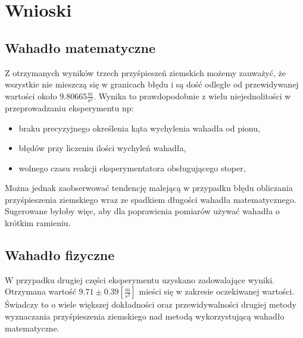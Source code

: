 \documentclass[11pt]{article}
\begin{document}
    \section{Wnioski}
    \subsection*{Wahadło matematyczne}
    Z otrzymanych wyników trzech przyśpieszeń ziemskich możemy zauważyć, że wszystkie nie mieszczą
    się w granicach błędu i są dość odległe od przewidywanej wartości około $9.80665\frac{m}{s^2}$.
    Wynika to prawdopodobnie z wielu niejednolitości w przeprowadzaniu eksperymentu np:
    \begin{itemize}
        \item braku precyzyjnego określenia kąta wychylenia wahadła od pionu,
        \item błędów przy liczeniu ilości wychyleń wahadła,
        \item wolnego czasu reakcji eksperymentatora obsługującego stoper,
    \end{itemize}
    Można jednak zaobserwować tendencję malejącą w przypadku błędu obliczania przyśpieszenia ziemskiego wraz ze spadkiem długości wahadła matematycznego.
    Sugerowane byłoby więc, aby dla poprawienia pomiarów używać wahadła o krótkim ramieniu.\\
    \subsection*{Wahadło fizyczne}
    W przypadku drugiej części eksperymentu uzyskano zadowalające wyniki. Otrzymana wartość $9.71\pm 0.39[\frac{m}{s^2}]$ mieści się w zakresie oczekiwanej wartości.
    Świadczy to o wiele większej dokładności oraz przewidywalności drugiej metody wyznaczania  przyśpieszenia ziemskiego nad metodą wykorzystującą wahadło matematyczne.
\end{document}
